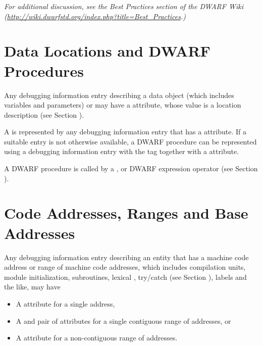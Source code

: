 \textit{For additional discussion, see the Best Practices section 
of the DWARF Wiki 
(\url{http://wiki.dwarfstd.org/index.php?title=Best_Practices}.)}

\section{Data Locations and DWARF Procedures}
\label{chap:datalocationsanddwarfprocedures}
\hypertarget{chap:DWATlocationdataobjectlocation}{}
Any debugging information entry describing a data object (which
includes variables and parameters) or 
may have a \DWATlocationDEFN{} attribute,
whose value is a location description
(see Section ).

A  is represented by any
debugging information entry that has a
\DWATlocationNAME{} attribute.
If a suitable entry is not otherwise available,
a DWARF procedure can be represented using a debugging
information entry 
with the tag \DWTAGdwarfprocedureTARG{} together with a 
\DWATlocationNAME{} attribute.  

A DWARF procedure is called by a \DWOPcalltwo, \DWOPcallfour{} 
or \DWOPcallref{} DWARF expression operator 
(see Section ).

\section{Code Addresses, Ranges and Base Addresses}
\label{chap:codeaddressesandranges}
Any debugging information entry describing an entity that has
a machine code address or range of machine code addresses,
which includes compilation units, module initialization,
subroutines, lexical , 
try/catch  (see Section ), 
labels and the like, may have
\begin{itemize}
\item \hypertarget{chap:DWATlowpccodeaddressorrangeofaddresses}{}
A \DWATlowpcDEFN{} attribute for a single address,

\item \hypertarget{chap:DWAThighpccontiguousrangeofcodeaddresses}{}
A \DWATlowpcDEFN{}
and \DWAThighpcDEFN{}
pair of attributes for a single contiguous range of
addresses, or

\item \hypertarget{chap:DWATrangesnoncontiguousrangeofcodeaddresses}{}
A \DWATrangesDEFN{} attribute
for a non-contiguous range of addresses.
\end{itemize}

